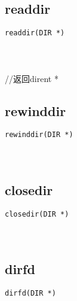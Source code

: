 \documentclass[10pt,a4paper]{article}
\begin{document}
\subsection{readdir}
\begin{spacing}{2.0}
\lstset{language=C,numbers=none}
\begin{lstlisting}
readdir(DIR *)
\end{lstlisting}
{\large\color[rgb]{0.2,0.4,0.6}{*:}}
\paragraph{ \ \ }//返回dirent *
\end{spacing}

\subsection{rewinddir}
\begin{spacing}{2.0}
\lstset{language=C,numbers=none}
\begin{lstlisting}
rewinddir(DIR *)
\end{lstlisting}
{\large\color[rgb]{0.2,0.4,0.6}{*:}}
\paragraph{ \ \ }
\end{spacing}

\subsection{closedir}
\begin{spacing}{2.0}
\lstset{language=C,numbers=none}
\begin{lstlisting}
closedir(DIR *)
\end{lstlisting}
{\large\color[rgb]{0.2,0.4,0.6}{*:}}
\paragraph{ \ \ }
\end{spacing}

\subsection{dirfd}
\begin{spacing}{2.0}
\lstset{language=C,numbers=none}
\begin{lstlisting}
dirfd(DIR *)
\end{lstlisting}
{\large\color[rgb]{0.2,0.4,0.6}{*:}}
\paragraph{ \ \ }
\end{spacing}
\end{document}
